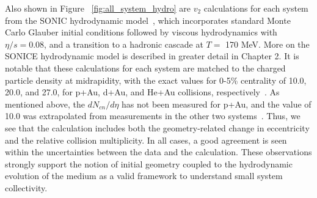 Also shown in Figure ~\ref{fig:all_system_hydro} are $v_2$ calculations for each system from the SONIC hydrodynamic model~\cite{Habich:2014jna}, which incorporates standard Monte Carlo Glauber initial conditions followed by viscous hydrodynamics with $\eta/s=0.08$, and a transition to a  hadronic cascade at $T=$ 170 MeV. More on the SONICE hydrodynamic model is described in greater detail in Chapter 2. It is notable that these calculations for each system are matched to the charged particle density at midrapidity, with the exact values for 0-5\% centrality of 10.0, 20.0, and 27.0, for p+Au, d+Au, and He+Au collisions, respectively~\cite{Habich:2014jna}. As mentioned above, the $dN_{cn}/d\eta$ has not been measured for p+Au, and the value of 10.0 was extrapolated from measurements in the other two systems~\cite{Habich:2014jna}. Thus, we see that the calculation includes both the geometry-related change in eccentricity and the relative collision multiplicity. In all cases, a good agreement is seen within the uncertainties between the data and the calculation. These observations strongly support the notion of initial geometry coupled to the hydrodynamic evolution of the medium as a valid framework to understand small system collectivity.


